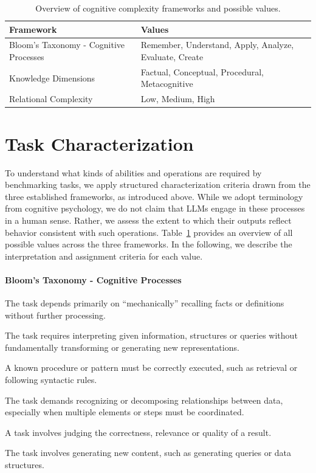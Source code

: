 \documentclass[
]{ceurart}
\begin{document}
\begin{table}
    \centering
    \caption{Overview of cognitive complexity frameworks and possible values.}
    \label{tab:taskCharacterizationValues}
    \begin{tabular}{ll}
    \toprule
       Framework  & Values \\
    \midrule
      Bloom's Taxonomy - Cognitive Processes~\cite{bloom1956}   & Remember, Understand, Apply, Analyze, Evaluate, Create \\
      Knowledge Dimensions~\cite{anderson2001}  & Factual, Conceptual, Procedural, Metacognitive \\
      Relational Complexity~\cite{halford1998}  & Low, Medium, High \\
      \bottomrule
    \end{tabular}
\end{table}


\section{Task Characterization}
To understand what kinds of abilities and operations are required by benchmarking tasks, we apply structured characterization criteria drawn from the three established frameworks, as introduced above. While we adopt terminology from cognitive psychology, we do not claim that LLMs engage in these processes in a human sense. Rather, we assess the extent to which their outputs reflect behavior consistent with such operations. Table~\ref{tab:taskCharacterizationValues} provides an overview of all possible values across the three frameworks. In the following, we describe the interpretation and assignment criteria for each value.

\paragraph{Bloom's Taxonomy - Cognitive Processes}
\begin{description}[style=multiline, leftmargin=25mm, font=\normalfont\itshape, parsep=0pt, itemsep=1pt]
    \item[Remember] The task depends primarily on ``mechanically'' recalling facts or definitions without further processing. 
     \item[Understand] The task requires interpreting given information, structures or queries without fundamentally transforming or generating new representations.  \item[Apply] A known procedure or pattern must be correctly executed, such as retrieval or following syntactic rules. 
     \item[Analyze] The task demands recognizing or decomposing relationships between data, especially when multiple elements or steps must be coordinated. \item[Evaluate] A task involves judging the correctness, relevance or quality of a result. 
     \item[Create] The task involves generating new content, such as generating queries or data structures.
\end{description}
\end{document}
